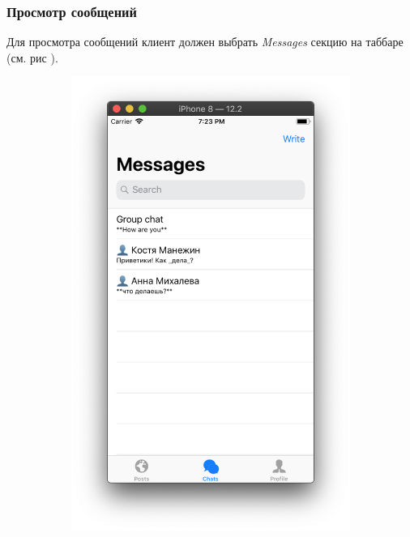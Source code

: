 \documentclass[a4paper,12pt]{article}
\begin{document}
	\subsubsection{Просмотр сообщений}
	Для просмотра сообщений клиент должен выбрать \textit{Messages} секцию на таббаре (см. рис ). 
		\begin{figure}[h!]
		\centering
		\begin{subfigure}[b]{0.3\linewidth}
			\includegraphics[width=\linewidth]{../includes/pmi/chats.png}
		\end{subfigure}
		\begin{subfigure}[b]{0.3\linewidth}

\end{subfigure}
\end{figure}
\end{document}

